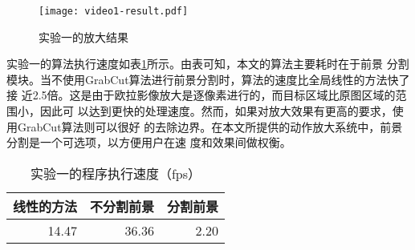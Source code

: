 
\begin{figure}[htbp]
  \centering
  \texttt{[image: video1-result.pdf]}
  \caption{实验一的放大结果}
  \label{fig:exam1-result}
\end{figure}

实验一的算法执行速度如表\ref{tab:time1}所示。由表可知，本文的算法主要耗时在于前景
分割模块。当不使用GrabCut算法进行前景分割时，算法的速度比全局线性的方法快了接
近2.5倍。这是由于欧拉影像放大是逐像素进行的，而目标区域比原图区域的范围小，因此可
以达到更快的处理速度。然而，如果对放大效果有更高的要求，使用GrabCut算法则可以很好
的去除边界。在本文所提供的动作放大系统中，前景分割是一个可选项，以方便用户在速
度和效果间做权衡。

\begin{table}[htbp]
  \centering
  \caption{实验一的程序执行速度（fps）}
  \label{tab:time1}
  \begin{tabular}[c]{rrr}
    \toprule[1.5pt]
    线性的方法 & 不分割前景 & 分割前景 \\
    \midrule
    14.47 & 36.36 & 2.20 \\
    \bottomrule[1.5pt]
  \end{tabular}
\end{table}

